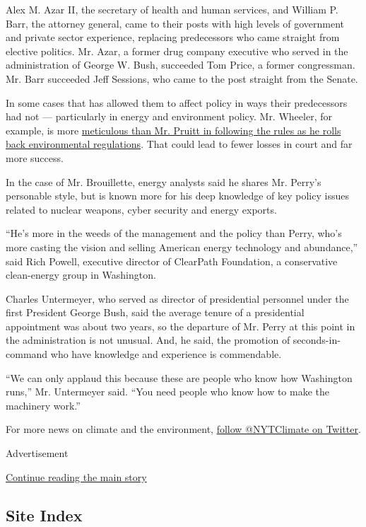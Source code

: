 Alex M. Azar II, the secretary of health and human services, and William
P. Barr, the attorney general, came to their posts with high levels of
government and private sector experience, replacing predecessors who
came straight from elective politics. Mr. Azar, a former drug company
executive who served in the administration of George W. Bush, succeeded
Tom Price, a former congressman. Mr. Barr succeeded Jeff Sessions, who
came to the post straight from the Senate.

In some cases that has allowed them to affect policy in ways their
predecessors had not --- particularly in energy and environment policy.
Mr. Wheeler, for example, is more
\href{https://www.nytimes3xbfgragh.onion/2018/11/21/climate/andrew-wheeler-epa.html}{meticulous
than Mr. Pruitt in following the rules as he rolls back environmental
regulations}. That could lead to fewer losses in court and far more
success.

In the case of Mr. Brouillette, energy analysts said he shares Mr.
Perry's personable style, but is known more for his deep knowledge of
key policy issues related to nuclear weapons, cyber security and energy
exports.

``He's more in the weeds of the management and the policy than Perry,
who's more casting the vision and selling American energy technology and
abundance,'' said Rich Powell, executive director of ClearPath
Foundation, a conservative clean-energy group in Washington.

Charles Untermeyer, who served as director of presidential personnel
under the first President George Bush, said the average tenure of a
presidential appointment was about two years, so the departure of Mr.
Perry at this point in the administration is not unusual. And, he said,
the promotion of seconds-in-command who have knowledge and experience is
commendable.

``We can only applaud this because these are people who know how
Washington runs,'' Mr. Untermeyer said. ``You need people who know how
to make the machinery work.''

For more news on climate and the environment,
\href{https://twitter.com/nytclimate}{follow @NYTClimate on Twitter}.

Advertisement

\protect\hyperlink{after-bottom}{Continue reading the main story}

\hypertarget{site-index}{%
\subsection{Site Index}\label{site-index}}

